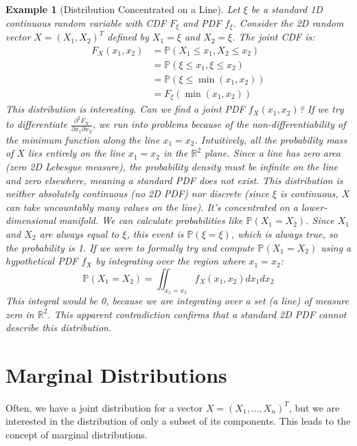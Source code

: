 \documentclass[11pt]{article}
\newtheorem{example}[theorem]{Example}
\theoremstyle{definition} %
\newcommand{\R}{\mathbb{R}} %
\renewcommand{\P}{\mathbb{P}} %
\begin{document}
\begin{example}[Distribution Concentrated on a Line] \label{ex:degenerate_line}
Let $\xi$ be a standard 1D continuous random variable with CDF $F_\xi$ and PDF $f_\xi$. Consider the 2D random vector $X = (X_1, X_2)^T$ defined by $X_1 = \xi$ and $X_2 = \xi$.
The joint CDF is:
\begin{align*} F_X(x_1, x_2) &= \P(X_1 \le x_1, X_2 \le x_2) \\ &= \P(\xi \le x_1, \xi \le x_2) \\ &= \P(\xi \le \min(x_1, x_2)) \\ &= F_\xi(\min(x_1, x_2)) \end{align*}
This distribution is interesting. Can we find a joint PDF $f_X(x_1, x_2)$? If we try to differentiate $\frac{\partial^2 F_X}{\partial x_1 \partial x_2}$, we run into problems because of the non-differentiability of the minimum function along the line $x_1 = x_2$.
Intuitively, all the probability mass of $X$ lies entirely on the line $x_1 = x_2$ in the $\R^2$ plane. Since a line has zero area (zero 2D Lebesgue measure), the probability density must be infinite on the line and zero elsewhere, meaning a standard PDF does not exist.
This distribution is neither absolutely continuous (no 2D PDF) nor discrete (since $\xi$ is continuous, $X$ can take uncountably many values on the line). It's concentrated on a lower-dimensional manifold.
We can calculate probabilities like $\P(X_1 = X_2)$. Since $X_1$ and $X_2$ are always equal to $\xi$, this event is $\P(\xi = \xi)$, which is always true, so the probability is 1.
If we were to formally try and compute $\P(X_1 = X_2)$ using a hypothetical PDF $f_X$ by integrating over the region where $x_1 = x_2$:
\[ \P(X_1 = X_2) = \iint_{x_1 = x_2} f_X(x_1, x_2) dx_1 dx_2 \]
This integral would be 0, because we are integrating over a set (a line) of measure zero in $\R^2$. This apparent contradiction confirms that a standard 2D PDF cannot describe this distribution.
\end{example}

\section{Marginal Distributions}

Often, we have a joint distribution for a vector $X = (X_1, \dots, X_n)^T$, but we are interested in the distribution of only a subset of its components. This leads to the concept of marginal distributions.
\end{document}
